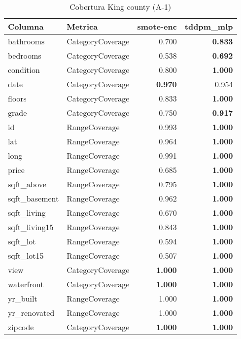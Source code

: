\begin{table}[H]
\centering
\caption{Cobertura King county (A-1)}
\label{table-coverage-king county-a-1}
\begin{tabular}{|l|l|r|r|}
\hline
\rowcolor[gray]{0.8}
Columna & Metrica & smote-enc & tddpm\_mlp \\
\hline bathrooms & CategoryCoverage & 0.700 & \bfseries 0.833 \\
\hline bedrooms & CategoryCoverage & 0.538 & \bfseries 0.692 \\
\hline condition & CategoryCoverage & 0.800 & \bfseries 1.000 \\
\hline date & CategoryCoverage & \bfseries 0.970 & 0.954 \\
\hline floors & CategoryCoverage & 0.833 & \bfseries 1.000 \\
\hline grade & CategoryCoverage & 0.750 & \bfseries 0.917 \\
\hline id & RangeCoverage & 0.993 & \bfseries 1.000 \\
\hline lat & RangeCoverage & 0.964 & \bfseries 1.000 \\
\hline long & RangeCoverage & 0.991 & \bfseries 1.000 \\
\hline price & RangeCoverage & 0.685 & \bfseries 1.000 \\
\hline sqft\_above & RangeCoverage & 0.795 & \bfseries 1.000 \\
\hline sqft\_basement & RangeCoverage & 0.962 & \bfseries 1.000 \\
\hline sqft\_living & RangeCoverage & 0.670 & \bfseries 1.000 \\
\hline sqft\_living15 & RangeCoverage & 0.843 & \bfseries 1.000 \\
\hline sqft\_lot & RangeCoverage & 0.594 & \bfseries 1.000 \\
\hline sqft\_lot15 & RangeCoverage & 0.507 & \bfseries 1.000 \\
\hline view & CategoryCoverage & \bfseries 1.000 & \bfseries 1.000 \\
\hline waterfront & CategoryCoverage & \bfseries 1.000 & \bfseries 1.000 \\
\hline yr\_built & RangeCoverage & 1.000 & \bfseries 1.000 \\
\hline yr\_renovated & RangeCoverage & 1.000 & \bfseries 1.000 \\
\hline zipcode & CategoryCoverage & \bfseries 1.000 & \bfseries 1.000 \\
\hline
\end{tabular}
\end{table}

